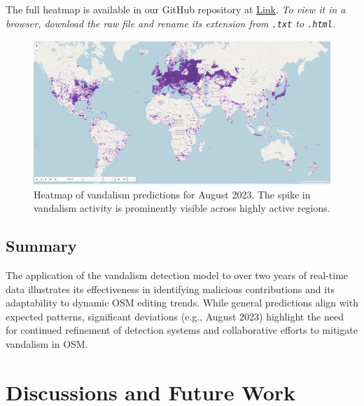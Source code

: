 \documentclass[
    13pt, %
    a4paper, %
    listof=totoc, %
    bibliography=totoc, %
    index=totoc, %
    headsepline
]{scrreprt}
\begin{document}
\vspace{0.5em}
\newcommand{\heatmaplink}{\href{https://github.com/rspseshasai/vandalism_detection_osm/blob/9bacd8550381ccce93dcb0bbf01d62f3d8764f30/data/contribution_data/output/plots/vandalism_predictions_2022_to_2024_heat_map_contribution_data.html}{Link}}

\noindent The full heatmap is available in our GitHub repository at \heatmaplink. \textit{To view it in a browser, download the raw file and rename its extension from \texttt{.txt} to \texttt{.html}.}

\begin{figure}[H]
    \centering
    \includegraphics[width=\textwidth]{vandalism_heat_map_aug_2023.png}
    \caption{Heatmap of vandalism predictions for August 2023. The spike in vandalism activity is prominently visible across highly active regions.}
    \label{fig:vandalism_heatmap_aug_2023}
\end{figure}


\section{Summary}
The application of the vandalism detection model to over two years of real-time data illustrates its effectiveness in identifying malicious contributions and its adaptability to dynamic OSM editing trends. While general predictions align with expected patterns, significant deviations (e.g., August 2023) highlight the need for continued refinement of detection systems and collaborative efforts to mitigate vandalism in OSM.

\chapter{Discussions and Future Work}
\label{chapter:discussions_and_future_work}
\end{document}
